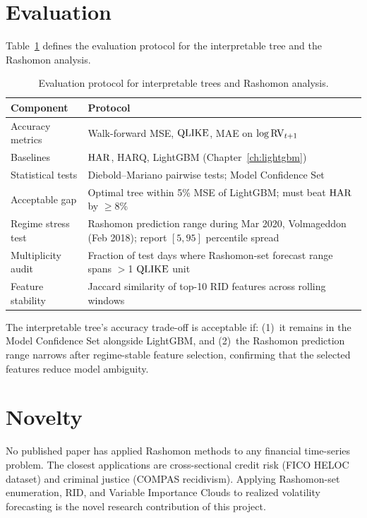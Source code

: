 \section{Evaluation}
\label{sec:rashomon-eval}

Table~\ref{tab:rashomon-eval} defines the evaluation protocol for the interpretable tree and the Rashomon analysis.

\begin{table}[htbp]
\centering
\caption{Evaluation protocol for interpretable trees and Rashomon analysis.}
\label{tab:rashomon-eval}
\small
\begin{tabular}{@{}lp{8cm}@{}}
\toprule
\textbf{Component} & \textbf{Protocol} \\
\midrule
Accuracy metrics    & Walk-forward MSE, $\operatorname{QLIKE}$, MAE on $\log \operatorname{RV}_{t+1}$ \\
Baselines           & $\operatorname{HAR}$, HARQ, LightGBM (Chapter~\ref{ch:lightgbm}) \\
Statistical tests   & Diebold--Mariano \citep{DieboldMariano1995} pairwise tests; Model Confidence Set \\
Acceptable gap      & Optimal tree within 5\% MSE of LightGBM; must beat $\operatorname{HAR}$ by $\geq$8\% \\
Regime stress test  & Rashomon prediction range during Mar 2020, Volmageddon (Feb 2018); report $[5, 95]$ percentile spread \\
Multiplicity audit  & Fraction of test days where Rashomon-set forecast range spans $>$1 $\operatorname{QLIKE}$ unit \\
Feature stability   & Jaccard similarity of top-10 RID features across rolling windows \\
\bottomrule
\end{tabular}
\end{table}

The interpretable tree's accuracy trade-off is acceptable if:
(1)~it remains in the Model Confidence Set alongside LightGBM, and
(2)~the Rashomon prediction range narrows after regime-stable feature selection, confirming that the selected features reduce model ambiguity.


\section{Novelty}
\label{sec:rashomon-novelty}

No published paper has applied Rashomon methods to any financial time-series problem.
The closest applications are cross-sectional credit risk (FICO HELOC dataset) and criminal justice (COMPAS recidivism).
Applying Rashomon-set enumeration, RID, and Variable Importance Clouds to realized volatility forecasting is the novel research contribution of this project.


